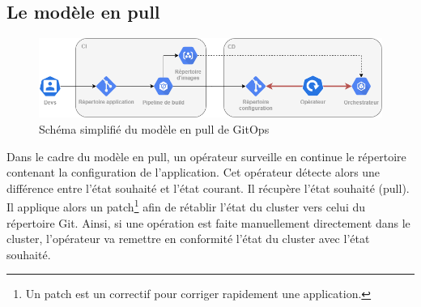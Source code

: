\documentclass[11pt,fleqn]{book} %
\begin{document}
\subsection{Le modèle en pull}
\begin{figure}[H]
\renewcommand{\figurename}{Schéma}
\hspace{-1cm}
\includegraphics[scale=0.6]{Pictures/CI-CD/pull-model.png}
\captionsetup{margin=1.5cm,format=hang,justification=justified}
\caption[]{Schéma simplifié du modèle en pull de GitOps \newline}
\end{figure}

Dans le cadre du modèle en pull, un opérateur surveille en continue le répertoire contenant la configuration de l'application. Cet opérateur détecte alors une différence entre l'état souhaité et l'état courant. Il récupère l'état souhaité (pull). Il applique alors un patch\footnote{Un patch est un correctif pour corriger rapidement une application.} afin de rétablir l'état du cluster vers celui du répertoire Git. Ainsi, si une opération est faite manuellement directement dans le cluster, l'opérateur va remettre en conformité l'état du cluster avec l'état souhaité.
\end{document}
